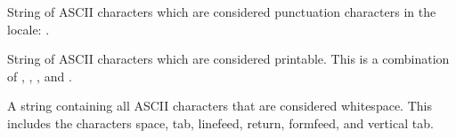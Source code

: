 \documentclass[letterpaper,10pt,english]{sphinxmanual}
\begin{document}

\begin{fulllineitems}
\label{\detokenize{string:string.punctuation}}
String of ASCII characters which are considered punctuation characters
in the  locale: .

\end{fulllineitems}


\begin{fulllineitems}
\label{\detokenize{string:string.printable}}
String of ASCII characters which are considered printable.  This is a
combination of {\hyperref[\detokenize{string:string.digits}]{}}, {\hyperref[\detokenize{string:string.ascii_letters}]{}}, {\hyperref[\detokenize{string:string.punctuation}]{}},
and {\hyperref[\detokenize{string:string.whitespace}]{}}.

\end{fulllineitems}


\begin{fulllineitems}
\label{\detokenize{string:string.whitespace}}
A string containing all ASCII characters that are considered whitespace.
This includes the characters space, tab, linefeed, return, formfeed, and
vertical tab.

\end{fulllineitems}
\end{document}
